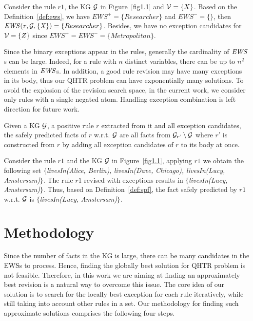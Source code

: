 \begin{example}
Consider the rule $r1$, the KG $\mathcal{G}$ in Figure~\ref{fig1.1} and $\mathcal{V} = \{X\}$. Based on the Definition~\ref{def:ews}, we have $EWS^+ = \{Researcher\}$ and $EWS^- = \{\}$, then $\mathit{EWS(r,\mathcal{G},\{X\})}=\{Researcher\}$. Besides, we have no exception candidates for $\mathcal{V} = \{Z\}$ since $EWS^+ = EWS^- = \{Metropolitan\}$.
\end{example}

Since the binary exceptions appear in the rules, generally the cardinality of $\mathit{EWS}$s can be large. Indeed, for a rule with $n$ distinct variables, there can be up to $n^2$ elements in $\mathit{EWS}$s. In addition, a good rule revision may have many exceptions in its body, thus our QHTR problem can have exponentially many solutions. To avoid the explosion of the revision search space, in the current work, we consider only rules with a single negated atom. Handling exception combination is left direction for future work.

\begin{definition} \label{def:spf}
Given a KG $\mathcal{G}$, a positive rule $r$ extracted from it and all exception candidates, the safely predicted facts of $r$ w.r.t. $\mathcal{G}$ are all facts from $\mathcal{G}_{r'} \setminus \mathcal{G}$ where $r'$ is constructed from $r$ by adding all exception candidates of $r$ to its body at once.
\end{definition}

\begin{example}
Consider the rule $r1$ and the KG $\mathcal{G}$ in Figure~\ref{fig1.1}, applying $r1$ we obtain the following set \textit{$\{$livesIn(Alice, Berlin), livesIn(Dave, Chicago), livesIn(Lucy, Amstersam)$\}$}. The rule $r1$ revised with exceptions results in \textit{$\{$livesIn(Lucy, Amstersam)$\}$}. Thus, based on Definition~\ref{def:spf}, the fact safely predicted by $r1$ w.r.t. $\mathcal{G}$ is \textit{$\{$livesIn(Lucy, Amstersam)$\}$}.
\end{example}

\section{Methodology}\label{sec:meth}

Since the number of facts in the KG is large, there can be many candidates in the EWSs to process. Hence, finding the globally best solution for QHTR problem is not feasible. Therefore, in this work we are aiming at finding an approximately best revision is a natural way to overcome this issue. The core idea of our solution is to search for the locally best exception for each rule iteratively, while still taking into account other rules in a set. Our methodology for finding such approximate solutions comprises the following four steps.
\medskip

